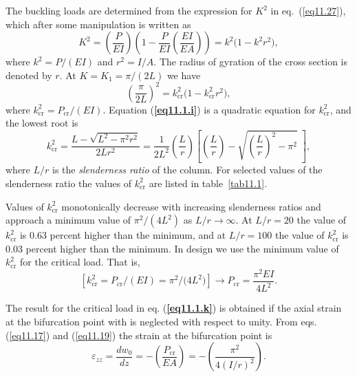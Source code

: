 \documentclass{AeroStructure-ERJohnson}
\begin{document}
\begin{example}
The buckling loads are determined from the expression for $K^{2}$ in eq.~(\ref{eq11.27}), which after some manipulation is written as
\begin{equation}
K^{2}=\left(\frac{P}{EI}\right)\left(1-\frac{P}{EI}\left(\frac{EI}{E A}\right)\right)=k^{2}\big(1-k^{2} r^{2}\big), \label{eq11.1.h}\tag{h}
\end{equation}
where $k^{2}=P /(E I) $ and $ r^{2}=I/A $. The radius of gyration of the cross section is denoted by $r$. At $ K=K_{1}=\pi /(2 L) $ we have
\begin{equation}
\left(\frac{\pi}{2L}\right)^{2}=k_{\mathrm{cr}}^{2}\big(1-k_{\mathrm{cr}}^{2} r^{2}\big) ,\label{eq11.1.i}\tag{i}
\end{equation}
where $k_{\mathrm{cr}}^{2}=P_{\mathrm{cr}} /(EI)$. Equation (\textbf{\ref{eq11.1.i}}) is a quadratic equation for $ k_{\mathrm{cr}}^{2} $, and the lowest root is
\begin{equation}
k_{\mathrm{cr}}^{2}=\frac{L-\sqrt{L^{2}-\pi^{2} r^{2}}}{2 L r^{2}}=\frac{1}{2 L^{2}}\left(\frac{L}{r}\right)\left[\left(\frac{L}{r}\right)-\sqrt{\left(\frac{L}{r}\right)^{2}-\pi^{2}}\;\right] , \label{eq11.1.j}\tag{j}
\end{equation}
where $L/r$ is the \textit{slenderness ratio} of the column. For selected values of the slenderness ratio the values of $ k_{\mathrm{cr}}^{2} $ are listed in table~\ref{tab11.1}.

Values of $k_{\mathrm{cr}}^{2} $ monotonically decrease with increasing slenderness ratios and approach a minimum value of $ \pi^{2} /\left(4 L^{2}\right) $ as $ L/r \rightarrow \infty $. At $ L/r=20 $ the value of $ k_{\mathrm{cr}}^{2} $ is 0.63 percent higher than the minimum, and at $ L/r=100 $ the value of $ k_{\mathrm{cr}}^{2} $ is 0.03 percent higher than the minimum. In design we use the minimum value of $ k_{\mathrm{cr}}^{2} $ for the critical load. That is,
\begin{equation}
\left[k_{\mathrm{cr}}^{2}=P_{\mathrm{cr}} /(E I)=\pi^{2} /\big(4 L^{2}\big)\right] \rightarrow P_{\mathrm{cr}}=\frac{\pi^{2} E I}{4 L^{2}}. \label{eq11.1.k}\tag{k}
\end{equation}

The result for the critical load in eq. (\textbf{\ref{eq11.1.k}}) is obtained if the axial strain at the bifurcation point with is neglected with respect to unity. From eqs. (\ref{eq11.17}) and (\ref{eq11.19}) the strain at the bifurcation point is
\begin{equation*}
\varepsilon_{z z}=\frac{d w_{0}}{d z}=-\left(\frac{P_{\textrm{cr}}}{E A}\right)=-\left(\frac{\pi^{2}}{4(I/r)^{2}}\right).
\end{equation*}
\vspace*{5pt}
\pagebreak


\end{example}
\end{document}
